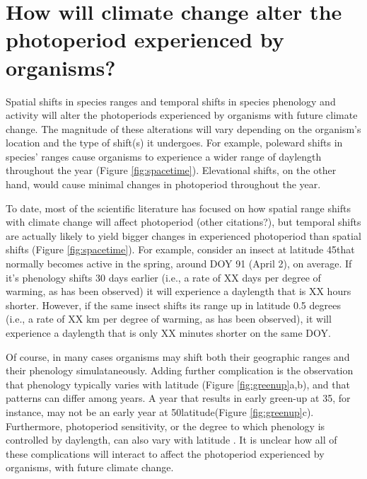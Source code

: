 \documentclass{article}
\begin{document}
\section*{How will climate change alter the photoperiod experienced by organisms?}
\par Spatial shifts in species ranges and temporal shifts in species phenology and activity will alter the photoperiods experienced by organisms with future climate change. The magnitude of these alterations will vary depending on the organism's location and the type of shift(s) it undergoes. For example, poleward shifts in species' ranges cause organisms to experience a wider range of daylength throughout the year (Figure \ref{fig:spacetime}). Elevational shifts, on the other hand, would cause minimal changes in photoperiod throughout the year. 
\par To date, most of the scientific literature has focused on how spatial range shifts with climate change will affect photoperiod \citep{saikkonen2012} (other citations?), but temporal shifts are actually likely to yield bigger changes in experienced photoperiod than spatial shifts (Figure \ref{fig:spacetime}). For example, consider an insect at latitude 45\degree that normally becomes active in the spring, around DOY 91 (April 2), on average. If it's phenology shifts 30 days earlier (i.e., a rate of XX days per degree of warming, as has been observed) it will experience a daylength that is XX hours shorter. However, if the same insect shifts its range up in latitude 0.5 degrees (i.e., a rate of XX km per degree of warming, as has been observed), it will experience a daylength that is only XX minutes shorter on the same DOY. 
\par Of course, in many cases organisms may shift both their geographic ranges and their phenology simulataneously. Adding further complication is the observation that phenology typically varies with latitude (Figure \ref{fig:greenup}a,b), and that patterns can differ among years. A year that results in early green-up at 35\degree, for instance, may not be an early year at 50\degree latitude(Figure \ref{fig:greenup}c). Furthermore, photoperiod sensitivity, or the degree to which phenology is controlled by daylength, can also vary with latitude \citep{Howe:1996,saikkonen2012,Partanen:2005aa,Vihera-Aarnio:2006aa,Caffarra:2011b,gauzere2017}. It is unclear how all of these complications will interact to affect the photoperiod experienced by organisms, with future climate change.
\end{document}
